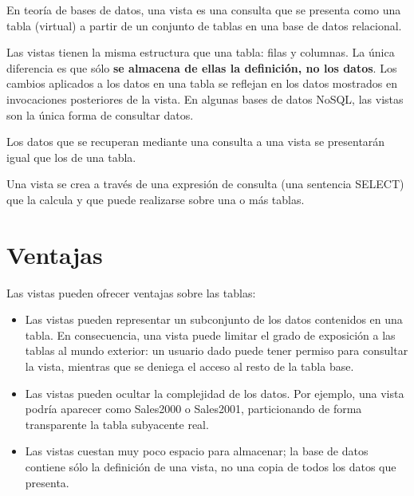 \documentclass[12pt, fleqn]{report}                             %
\begin{document}
        En teoría de bases de datos, una vista es una consulta que se presenta como una tabla (virtual)
        a partir de un conjunto de tablas en una base de datos relacional.

        Las vistas tienen la misma estructura que una tabla: filas y columnas.
        La única diferencia es que sólo \textbf{se almacena de ellas la definición, no los datos}.
        Los cambios aplicados a los datos en una tabla se reflejan en los datos mostrados en invocaciones
        posteriores de la vista.
        En algunas bases de datos NoSQL, las vistas son la única forma de consultar datos.

        Los datos que se recuperan mediante una consulta a una vista se presentarán igual que los de una tabla.

        Una vista se crea a través de una expresión de consulta (una sentencia SELECT) que la calcula y que puede
        realizarse sobre una o más tablas.


        \section{Ventajas}

            Las vistas pueden ofrecer ventajas sobre las tablas:

            \begin{itemize}

                \item
                    Las vistas pueden representar un subconjunto de los datos contenidos en una tabla.
                    En consecuencia, una vista puede limitar el grado de exposición a las tablas al mundo exterior:
                    un usuario dado puede tener permiso para consultar la vista, mientras que se deniega el acceso
                    al resto de la tabla base.

                \item
                    Las vistas pueden ocultar la complejidad de los datos.
                    Por ejemplo, una vista podría aparecer como Sales2000 o Sales2001, particionando
                    de forma transparente la tabla subyacente real.

                \item 
                    Las vistas cuestan muy poco espacio para almacenar; la base de datos contiene sólo
                    la definición de una vista, no una copia de todos los datos que presenta.

            \end{itemize}
\end{document}
